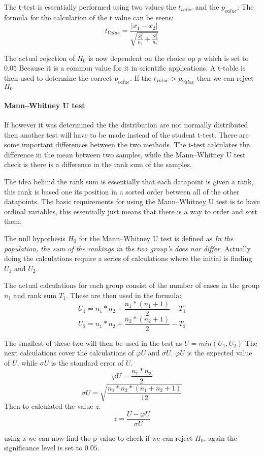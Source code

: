 The t-test is essentially performed using two values the $t_{value}$ and the $p_{value}$:
The formula for the calculation of the t value can be seens:
$$t_{Value} = \frac{|\bar{x_1}- \bar{x_2}|}{\sqrt{\frac{S_1^2}{n_1} + \frac{S_2^2}{n_2}}}$$ 

The actual rejection of $H_0$ is now dependent on the choice op $p$ which is set to $0.05$ Because it is a common value for it in scientific applications. A t-table is then used to determine the correct $p_{value}$.
If the $t_{Value} > p_{Value}$ then we can reject $H_0$

\paragraph{Mann–Whitney U test}
If however it was determined the the distribution are not normally distributed then another test will have to be made instead of the student t-test. There are some important differences between the two methods. The t-test calculates the difference in the mean between two samples, while the Mann–Whitney U test check is there is a difference in the rank sum of the samples\cite{mann1947test}. 

The idea behind the rank sum is essentially that each datapoint is given a rank, this rank is based one its position in a sorted order between all of the other datapoints. 
The basic requirements for using the Mann–Whitney U test is to have ordinal variables, this essentially just means that there is a way to order and sort them.

The null hypothesis $H_0$ for the Mann–Whitney U test is defined as \textit{In the population, the sum of the rankings in the two group's does nor differ.}
Actually doing the calculations require a series of calculations where the initial is finding $U_1$ and $U_2$.

The actual calculations for each group consist of the number of cases in the group $n_1$ and rank sum $T_1$. These are then used in the formula:
$$U_1 = n_1*n_2+\frac{n_1*(n_1+1)}{2}-T_1$$ 
$$U_2 = n_1*n_2+\frac{n_2*(n_2+1)}{2}-T_2$$

The smallest of these two will then be used in the test as $U=min(U_1,U_2)$
The next calculations cover the calculations of $\varphi U$ and $\sigma U$.
$\varphi U$ is the expected value of $U$, while $\sigma U$ is the standard error of $U$.
$$\varphi U = \frac{n_1*n_2}{2}$$
$$\sigma U = \sqrt{\frac{n_1*n_2*(n_1+n_2+1)}{12}}$$
Then to calculated the value $z$.
$$z = \frac{U-\varphi U}{\sigma U}$$

using z we can now find the p-value to check if we can reject $H_0$, again the significance level is set to $0.05$. 